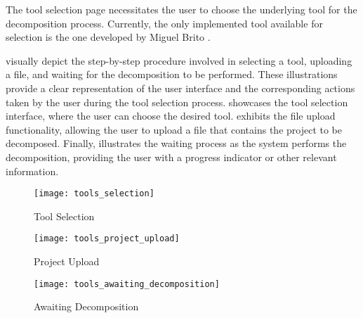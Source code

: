 The tool selection page necessitates the user to choose the underlying tool for
the decomposition process. Currently, the only implemented tool available for
selection is the one developed by Miguel Brito
.

visually depict the step-by-step procedure involved in selecting a tool,
uploading a file, and waiting for the decomposition to be performed. These
illustrations provide a clear representation of the user interface and the
corresponding actions taken by the user during the tool selection process.
 showcases the tool selection interface, where the user
can choose the desired tool.  exhibits the file upload
functionality, allowing the user to upload a file that contains the project to
be decomposed. Finally,  illustrates the
waiting process as the system performs the decomposition, providing the user
with a progress indicator or other relevant information.

\begin{figure*}[!htb]
  \caption{Tool Selection}
  \label{fig:tool_selection}
  \centering
  \texttt{[image: tools\_selection]}
\end{figure*}
\begin{figure*}[!htb]
  \caption{Project Upload}
  \label{fig:project_upload}
  \centering
  \texttt{[image: tools\_project\_upload]}
\end{figure*}
\begin{figure*}[!htb]
  \caption{Awaiting Decomposition}
  \label{fig:awaiting_decomposition}
  \centering
  \texttt{[image: tools\_awaiting\_decomposition]}
\end{figure*}
